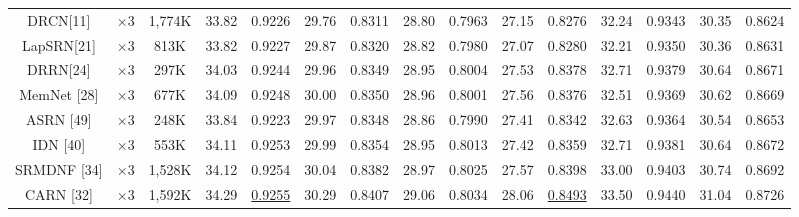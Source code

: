 \documentclass{ieeeaccess}
\begin{document}
\begin{table}
\begin{tabular}{|c|c|c|cc|cc|cc|cc|cc|cc|}
DRCN[11]&$\times3$ &1,774K& \multicolumn{1}{c|}{33.82} & 0.9226 & \multicolumn{1}{c|}{29.76} &0.8311 &\multicolumn{1}{c|}{28.80} & 0.7963& \multicolumn{1}{c|}{27.15} &0.8276 & \multicolumn{1}{c|}{32.24} & 0.9343
&\multicolumn{1}{c|}{30.35} & 0.8624\\

LapSRN[21] &$\times3$ &813K& \multicolumn{1}{c|}{33.82} & 0.9227  & \multicolumn{1}{c|}{29.87} & 0.8320  &\multicolumn{1}{c|}{28.82} & 0.7980  & \multicolumn{1}{c|}{27.07} & 0.8280 & \multicolumn{1}{c|}{32.21} & 0.9350
&\multicolumn{1}{c|}{30.36} & 0.8631\\



DRRN[24]& $\times3$ &297K& \multicolumn{1}{c|}{34.03} &  0.9244 & \multicolumn{1}{c|}{29.96} & 0.8349 &\multicolumn{1}{c|}{28.95} & 0.8004 & \multicolumn{1}{c|}{27.53} & 0.8378 & \multicolumn{1}{c|}{32.71} & 0.9379
&\multicolumn{1}{c|}{30.64} &  0.8671\\

MemNet [28] & $\times3$ &677K& \multicolumn{1}{c|}{34.09} &0.9248  & \multicolumn{1}{c|}{30.00} &0.8350  &\multicolumn{1}{c|}{28.96} & 0.8001 & \multicolumn{1}{c|}{27.56} & 0.8376 & \multicolumn{1}{c|}{32.51} &0.9369
&\multicolumn{1}{c|}{ 30.62} &0.8669\\


ASRN [49]& $\times3$&248K& \multicolumn{1}{c|}{33.84} & 0.9223 & \multicolumn{1}{c|}{29.97} & 0.8348 &\multicolumn{1}{c|}{28.86} & 0.7990& \multicolumn{1}{c|}{27.41} & 0.8342 & \multicolumn{1}{c|}{32.63} & 0.9364
&\multicolumn{1}{c|}{30.54} &0.8653\\


IDN [40] & $\times3$&553K& \multicolumn{1}{c|}{34.11} & 0.9253 & \multicolumn{1}{c|}{29.99} & 0.8354 &\multicolumn{1}{c|}{28.95} & 0.8013 & \multicolumn{1}{c|}{27.42} & 0.8359 & \multicolumn{1}{c|}{32.71} & 0.9381
&\multicolumn{1}{c|}{30.64} &0.8672\\



SRMDNF [34] & $\times3$ &1,528K& \multicolumn{1}{c|}{34.12} & 0.9254& \multicolumn{1}{c|}{30.04} &0.8382 &\multicolumn{1}{c|}{28.97} & 0.8025& \multicolumn{1}{c|}{27.57} & 0.8398& \multicolumn{1}{c|}{33.00} & 0.9403
&\multicolumn{1}{c|}{30.74} &0.8692\\



CARN [32] & $\times3$ &1,592K& \multicolumn{1}{c|}{34.29} &{\color{blue}\underline{0.9255}} & \multicolumn{1}{c|}{30.29} & 0.8407 & \multicolumn{1}{c|}{29.06} & 0.8034 & \multicolumn{1}{c|}{28.06} & {\color{blue}\underline{0.8493}} & \multicolumn{1}{c|}{33.50} & 0.9440
&\multicolumn{1}{c|}{31.04} &0.8726\\




\end{tabular}
\end{table}
\end{document}
